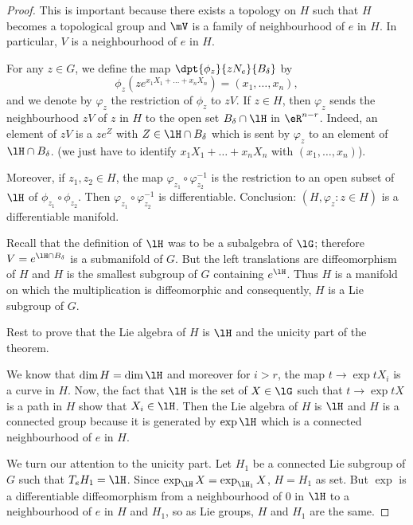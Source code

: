 \begin{proof}
This is important because there exists a topology on $H$ such that $H$ becomes a topological group and $\mV$ is a family of neighbourhood of $e$ in $H$. In particular, $V$ is a neighbourhood of $e$ in $H$.

For any $z\in G$, we define the map $\dpt{\phi_z}{zN_e}{B_{\delta}}$ by
\begin{equation}
  \phi_z(ze^{x_1X_1+\ldots+x_nX_n})=(x_1,\ldots,x_n),
\end{equation}
and we denote by $\varphi_z$ the restriction of $\phi_z$ to $zV$. If $z\in H$, then $\varphi_z$ sends the neighbourhood $zV$ of $z$ in $H$ to the open set $B_{\delta}\cap\lH$ in $\eR^{n-r}$. Indeed, an element of $zV$ is a $ze^Z$ with $Z\in\lH\cap B_{\delta}$ which is sent by $\varphi_z$ to an element of $\lH\cap B_{\delta}$. (we just have to identify $x_1X_1+\ldots+x_nX_n$ with $(x_1,\ldots,x_n)$).

Moreover, if $z_1,z_2\in H$, the map $\varphi_{z_1}\circ\varphi_{z_2}^{-1}$ is the restriction to an open subset of $\lH$ of $\phi_{z_1}\circ\phi_{z_2}$. Then $\varphi_{z_1}\circ\varphi_{z_2}^{-1}$ is differentiable. Conclusion: $(H,\varphi_z: z\in H)$ is a differentiable manifold.

Recall that the definition of $\lH$ was to be a subalgebra of $\lG$; therefore $V=e^{\lH\cap B_{\delta}}$ is a submanifold of $G$. But the left translations are diffeomorphism of $H$ and $H$ is the smallest subgroup of $G$ containing $e^{\lH}$. Thus $H$ is a manifold on which the multiplication is diffeomorphic and consequently, $H$ is a Lie subgroup of $G$.

Rest to prove that the Lie algebra of $H$ is $\lH$ and the unicity part of the theorem.

We know that $\dim H=\dim\lH$ and moreover for $i>r$, the map $t\to\exp tX_i$ is a curve in $H$. Now, the fact that $\lH$ is the set of $X\in\lG$ such that $t\to\exp tX$ is a path in $H$ show that $X_i\in\lH$. Then the Lie algebra of $H$ is $\lH$ and $H$ is a connected group because it is generated by $\exp\lH$ which is a connected neighbourhood of $e$ in $H$.

We turn our attention to the unicity part. Let $H_1$ be a connected Lie subgroup of $G$ such that $T_eH_1=\lH$. Since $\exp_{\lH}X=\exp_{\lH_1}X$, $H=H_1$ as set. But $\exp$ is a differentiable diffeomorphism from a neighbourhood of $0$ in $\lH$ to a neighbourhood of $e$ in $H$ and $H_1$, so as Lie groups, $H$ and $H_1$ are the same.


\end{proof}

